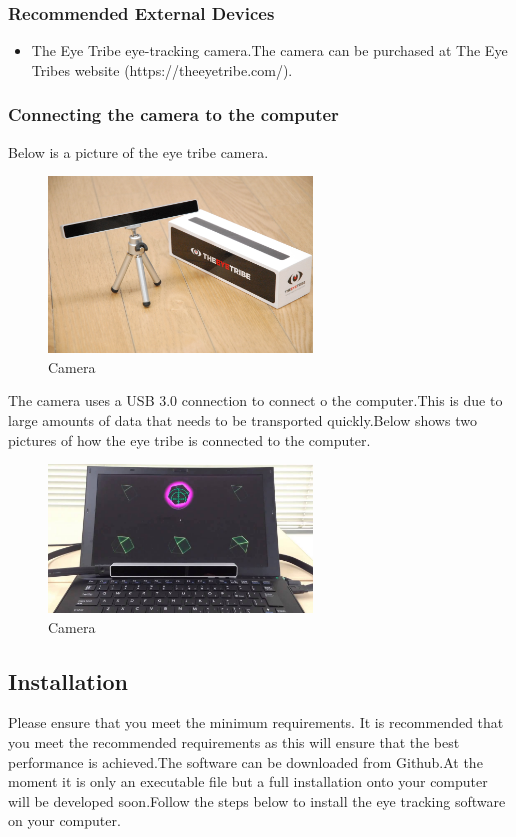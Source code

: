 \subsubsection{Recommended External Devices}
\begin{itemize}
\item The Eye Tribe eye-tracking camera.The camera can be purchased at The Eye Tribes website (https://theeyetribe.com/).
\end{itemize}

\subsubsection{Connecting the camera to the computer}
Below is a picture of the eye tribe camera. 

	\begin{figure}[!ht]
		\centering
		\includegraphics[scale=0.5, width=7cm, keepaspectratio]{./Images/eyetribepicture.jpg}
		\caption{Camera}
		\label{Camera}
	\end{figure}

The camera uses a  USB 3.0 connection to connect o the computer.This is due to large amounts of data that needs to be transported quickly.Below shows two pictures of how the eye tribe is connected to the computer.

\begin{figure}[!ht]
		\centering
		\includegraphics[scale=0.3, width=7cm, keepaspectratio]{./Images/connection.jpg}
		\caption{Camera}
		\label{Camera}
	\end{figure}

		

\subsection{Installation}
Please ensure that you meet the minimum requirements. It is recommended that you meet the recommended requirements as this will ensure that the best performance is achieved.The software can be downloaded from Github.At the moment it is only an executable file but a full installation onto your computer will be developed soon.Follow the steps below to install the eye tracking software on your computer.\\

